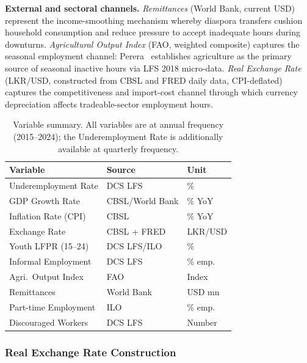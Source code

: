 \documentclass[sigconf]{acmart}
\begin{document}
\textbf{External and sectoral channels.} \emph{Remittances} (World
Bank, current USD) represent the income-smoothing mechanism
whereby diaspora transfers cushion household consumption and reduce
pressure to accept inadequate hours during downturns. \emph{Agricultural
Output Index} (FAO, weighted composite) captures the seasonal
employment channel: Perera~\cite{perera2022} establishes agriculture
as the primary source of seasonal inactive hours via LFS 2018
micro-data. \emph{Real Exchange Rate} (LKR/USD, constructed from CBSL
and FRED daily data, CPI-deflated) captures the competitiveness and
import-cost channel through which currency depreciation affects
tradeable-sector employment hours.

\begin{table}[h]
\caption{Variable summary. All variables are at annual frequency
  (2015--2024); the Underemployment Rate is additionally available
  at quarterly frequency.}
\label{tab:variables}
\setlength{\tabcolsep}{3.5pt}
\footnotesize
\begin{tabular}{lll}
\toprule
\textbf{Variable} & \textbf{Source} & \textbf{Unit}\\
\midrule
Underemployment Rate    & DCS LFS         & \%       \\
GDP Growth Rate         & CBSL/World Bank & \% YoY   \\
Inflation Rate (CPI)    & CBSL            & \% YoY   \\
Exchange Rate           & CBSL + FRED     & LKR/USD  \\
Youth LFPR (15--24)     & DCS LFS/ILO     & \%       \\
Informal Employment     & DCS LFS         & \% emp.  \\
Agri.\ Output Index     & FAO             & Index    \\
Remittances             & World Bank      & USD mn   \\
Part-time Employment    & ILO             & \% emp.  \\
Discouraged Workers     & DCS LFS         & Number   \\
\bottomrule
\end{tabular}
\end{table}

\subsubsection{Real Exchange Rate Construction}
\end{document}
